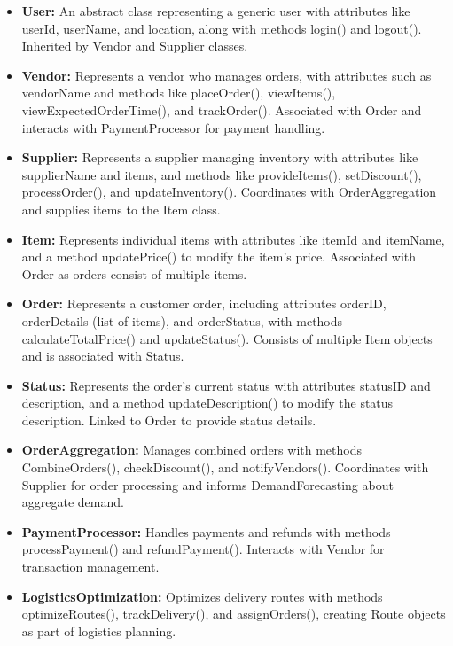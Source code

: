 \begin{itemize}
    \item \textbf{User:} An abstract class representing a generic user with attributes like userId, userName, and location, along with methods login() and logout(). Inherited by Vendor and Supplier classes.
    
    \item \textbf{Vendor:} Represents a vendor who manages orders, with attributes such as vendorName and methods like placeOrder(), viewItems(), viewExpectedOrderTime(), and trackOrder(). Associated with Order and interacts with PaymentProcessor for payment handling.
    
    \item \textbf{Supplier:} Represents a supplier managing inventory with attributes like supplierName and items, and methods like provideItems(), setDiscount(), processOrder(), and updateInventory(). Coordinates with OrderAggregation and supplies items to the Item class.
    
    \item \textbf{Item:} Represents individual items with attributes like itemId and itemName, and a method updatePrice() to modify the item's price. Associated with Order as orders consist of multiple items.
    
    \item \textbf{Order:} Represents a customer order, including attributes orderID, orderDetails (list of items), and orderStatus, with methods calculateTotalPrice() and updateStatus(). Consists of multiple Item objects and is associated with Status.
    
    \item \textbf{Status:} Represents the order's current status with attributes statusID and description, and a method updateDescription() to modify the status description. Linked to Order to provide status details.
    
    \item \textbf{OrderAggregation:} Manages combined orders with methods CombineOrders(), checkDiscount(), and notifyVendors(). Coordinates with Supplier for order processing and informs DemandForecasting about aggregate demand.
    
    \item \textbf{PaymentProcessor:} Handles payments and refunds with methods processPayment() and refundPayment(). Interacts with Vendor for transaction management.
    
    \item \textbf{LogisticsOptimization:} Optimizes delivery routes with methods optimizeRoutes(), trackDelivery(), and assignOrders(), creating Route objects as part of logistics planning.
    

\end{itemize}
